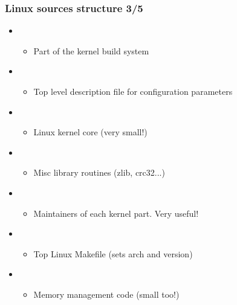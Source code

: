 \begin{frame}
  \frametitle{Linux sources structure 3/5}
  \begin{itemize}  
  \item {}
    \begin{itemize}
    \item Part of the kernel build system
    \end{itemize}
  \item {}
    \begin{itemize}
    \item Top level description file for configuration parameters
    \end{itemize}
  \item {}
    \begin{itemize}
    \item Linux kernel core (very small!)
    \end{itemize}
  \item {}
    \begin{itemize}
    \item Misc library routines (zlib, crc32...)
    \end{itemize}
  \item {}
    \begin{itemize}
    \item Maintainers of each kernel part. Very useful!
    \end{itemize}
  \item {}
    \begin{itemize}
    \item Top Linux Makefile (sets arch and version)
    \end{itemize}
  \item {}
    \begin{itemize}
    \item Memory management code (small too!)
    \end{itemize}
  \end{itemize}
\end{frame}

